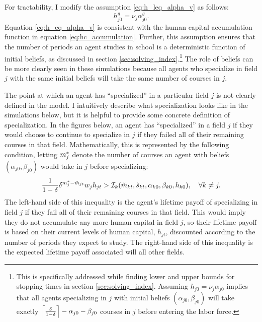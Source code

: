 For tractability, I modify the assumption \eqref{eq:h_leq_alpha_v} as follows:
\begin{equation}\label{eq:h_eq_alpha_v}
    h_{j0}^g = \nu_j \alpha_{j0}^g.
\end{equation}
Equation \eqref{eq:h_eq_alpha_v} is consistent with the human capital accumulation function in equation \eqref{eq:hc_accumulation}. 
Further, this assumption {}ensures that the number of periods an agent studies in school is a deterministic function of initial beliefs, as discussed in section \ref{sec:solving_index}.\footnote{
    This is specifically addressed while finding lower and upper bounds for stopping times in section \ref{sec:solving_index}.
    Assuming $h_{j0} = \nu_j \alpha_{j0}$ implies that all agents specializing in $j$ with initial beliefs $(\alpha_{j0}, \beta_{j0})$ will take exactly $\left\lceil \frac{\delta}{1 - \delta} \right\rceil - \alpha_{j0} - \beta_{j0}$ courses in $j$ before entering the labor force.  
}
The role of beliefs can be more clearly seen in these simulations because all agents who specialize in field $j$ with the same initial beliefs will take the same number of courses in $j$.%


The point at which an agent has ``specialized'' in a particular field $j$ is not clearly defined in the model. 
I intuitively describe what specialization looks like in the simulations below, but it is helpful to provide some concrete definition of specialization. 
In the figures below, an agent has ``specialized'' in a field $j$ if they would choose to continue to specialize in $j$ if they failed all of their remaining courses in that field.
Mathematically, this is represented by the following condition, letting $m_j^*$ denote the number of courses an agent with beliefs $(\alpha_{j0}, \beta_{j0})$ would take in $j$ before specializing:
\begin{equation*}
    \frac{1}{1 - \delta} 
    \delta^{m_j^* - \tilde{m}_{jt}}
    w_j h_{jt}
    >
    \mathcal{I}_{k} (\tilde{m}_{kt}, \tilde{s}_{kt}, \alpha_{k0}, \beta_{k0}, h_{k0}), \quad \forall k \neq j.
\end{equation*}
The left-hand side of this inequality is the agent's lifetime payoff of specializing in field $j$ if they fail all of their remaining courses in that field.
This would imply they do not accumulate any more human capital in field $j$, so their lifetime payoff is based on their current levels of human capital, $h_{jt}$, discounted according to the number of periods they expect to study.
The right-hand side of this inequality is the expected lifetime payoff associated will all other fields. 

